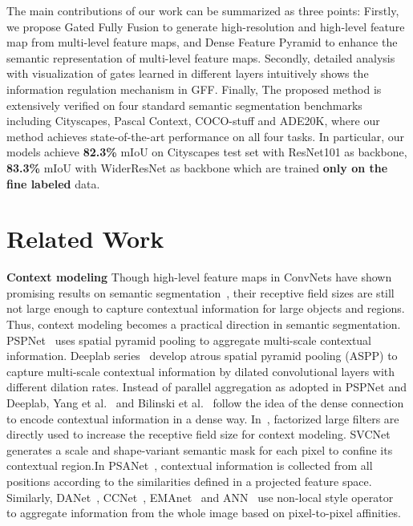 \documentclass[letterpaper]{article} \usepackage{aaai20}  \usepackage{times}  \usepackage{helvet} \usepackage{courier}  \usepackage[hyphens]{url}  \usepackage{graphicx} \urlstyle{rm} \def\UrlFont{\rm}  \usepackage{graphicx}  \usepackage{amsmath}
\begin{document}
The main contributions of our work can be summarized as three points: Firstly, we propose Gated Fully Fusion to generate high-resolution and high-level feature map from multi-level feature maps, and Dense Feature Pyramid to enhance the semantic representation of multi-level feature maps. Secondly, detailed analysis with visualization of gates learned in different layers intuitively shows the information regulation mechanism in GFF. Finally, The proposed method is extensively verified on four standard semantic segmentation benchmarks including Cityscapes, Pascal Context, COCO-stuff and ADE20K, where our method achieves state-of-the-art performance on all four tasks. In particular, our models achieve \textbf{82.3\%} mIoU on Cityscapes test set with ResNet101 as backbone, \textbf{83.3\%} mIoU with WiderResNet as backbone which are trained \textbf{only on the fine labeled} data.

%
 \section{Related Work}
\label{section: related work}



\textbf{Context modeling}
Though high-level feature maps in ConvNets have shown promising results on semantic segmentation~\cite{fcn}, their receptive field sizes are still not large enough to capture contextual information for large objects and regions. Thus, context modeling becomes a practical direction in semantic segmentation. PSPNet~\cite{pspnet} uses spatial pyramid pooling to aggregate multi-scale contextual information. Deeplab series~\cite{deeplabv1,deeplabv2,deeplabv3} develop atrous spatial pyramid pooling (ASPP) to capture multi-scale contextual information by dilated convolutional layers with different dilation rates. Instead of parallel aggregation as adopted in PSPNet and Deeplab, Yang et al.~\cite{denseaspp} and Bilinski et al.~\cite{densedecoder} follow the idea of the dense connection~\cite{densenet} to encode contextual information in a dense way. In~\cite{largekernel}, factorized large filters are directly used to increase the receptive field size for context modeling. SVCNet~\cite{SVCNet} generates a scale and shape-variant semantic mask for each pixel to confine its contextual region.In PSANet~\cite{psanet}, contextual information is collected from all positions according to the similarities defined in a projected feature space. Similarly, DANet~\cite{DAnet}, CCNet~\cite{ccnet}, EMAnet~\cite{EMAnet} and ANN~\cite{annnet} use non-local style operator~\cite{Nonlocal} to aggregate information from the whole image based on pixel-to-pixel affinities.
\end{document}
